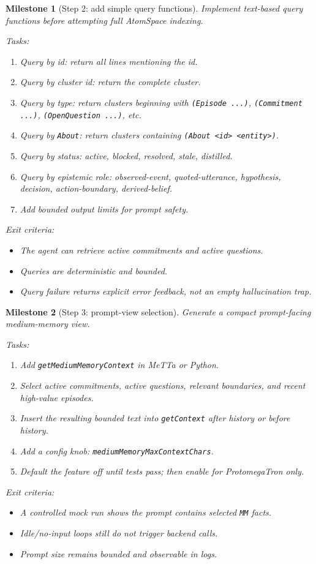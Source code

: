 \documentclass[11pt]{article}
\newtheorem{milestone}{Milestone}
\begin{document}
\begin{milestone}[Step 2: add simple query functions]
Implement text-based query functions before attempting full AtomSpace indexing.

Tasks:
\begin{enumerate}
  \item Query by id: return all lines mentioning the id.
  \item Query by cluster id: return the complete cluster.
  \item Query by type: return clusters beginning with \texttt{(Episode ...)},
        \texttt{(Commitment ...)}, \texttt{(OpenQuestion ...)}, etc.
  \item Query by \texttt{About}: return clusters containing \texttt{(About <id> <entity>)}.
  \item Query by status: active, blocked, resolved, stale, distilled.
  \item Query by epistemic role: observed-event, quoted-utterance, hypothesis,
        decision, action-boundary, derived-belief.
  \item Add bounded output limits for prompt safety.
\end{enumerate}

Exit criteria:
\begin{itemize}
  \item The agent can retrieve active commitments and active questions.
  \item Queries are deterministic and bounded.
  \item Query failure returns explicit error feedback, not an empty hallucination trap.
\end{itemize}
\end{milestone}

\begin{milestone}[Step 3: prompt-view selection]
Generate a compact prompt-facing medium-memory view.

Tasks:
\begin{enumerate}
  \item Add \texttt{getMediumMemoryContext} in MeTTa or Python.
  \item Select active commitments, active questions, relevant boundaries, and recent
        high-value episodes.
  \item Insert the resulting bounded text into \texttt{getContext} after history or
        before history.
  \item Add a config knob: \texttt{mediumMemoryMaxContextChars}.
  \item Default the feature off until tests pass; then enable for ProtomegaTron only.
\end{enumerate}

Exit criteria:
\begin{itemize}
  \item A controlled mock run shows the prompt contains selected \texttt{MM} facts.
  \item Idle/no-input loops still do not trigger backend calls.
  \item Prompt size remains bounded and observable in logs.
\end{itemize}
\end{milestone}
\end{document}
